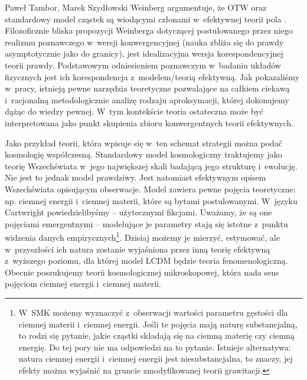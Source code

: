 \begin{artplenv}{Paweł Tambor, Marek Szydłowski}
Weinberg argumentuje, że OTW oraz standardowy model cząstek są wiodącymi członami w~efektywnej teorii pola
\parencite[][]{weinberg_effective_2016}. %
 Filozoficznie bliska propozycji Weinberga dotyczącej postulowanego przez niego realizmu poznawczego w~wersji konwergencyjnej (nauka zbliża się do prawdy asymptotycznie jako do granicy), jest idealizacyjna wersja korespondencyjnej teorii prawdy. Podstawowym odniesieniem poznawczym w~badaniu układów fizycznych jest ich korespondencja z~modelem/teorią efektywną. Jak pokazaliśmy w~pracy, istnieją pewne narzędzia teoretyczne pozwalające na całkiem ciekawą i~racjonalną metodologicznie analizę rodzaju aproksymacji, której dokonujemy dążąc do wiedzy pewnej. W~tym kontekście teoria ostateczna może być interpretowana jako punkt skupienia zbioru konwergentnych teorii efektywnych.

Jako przykład teorii, która wpisuje się w~ten schemat strategii można podać kosmologię współczesną. Standardowy model kosmologiczny traktujemy jako teorię Wszechświata w~jego największej skali badającą jego strukturę i~ewolucję. Nie jest to jednak model prawdziwy. Jest natomiast efektywnym opisem Wszechświata opisującym obserwacje. Model zawiera pewne pojęcia teoretyczne: np. ciemnej energii i~ciemnej materii, które są bytami postulowanymi. W~języku Cartwright powiedzielibyśmy -- użytecznymi fikcjami. Uważamy, że są one pojęciami emergentnymi -- modelujące je parametry stają się istotne z~punktu widzenia danych empirycznych\footnote{W~SMK możemy wyznaczyć z~obserwacji wartości parametru gęstości dla ciemnej materii i~ciemnej energii. Jeśli te pojęcia mają naturę substancjalną, to rodzi się pytanie, jakie cząstki składają się na ciemną materię czy ciemną energię. Do tej pory nie ma odpowiedzi na to pytanie. Istnieje alternatywa: natura ciemnej energii i~ciemnej energii jest niesubstancjalna, to znaczy, jej efekty można wyjaśnić na gruncie zmodyfikowanej teorii grawitacji.}. Dzisiaj możemy je mierzyć, estymować, ale w~przyszłości ich natura zostanie wyjaśniona przez inną teorię efektywną z~wyższego poziomu, dla której model LCDM będzie teoria fenomenologiczną. Obecnie poszukujemy teorii kosmologicznej mikroskopowej, która nada sens pojęciom ciemnej energii i~ciemnej materii.


\end{artplenv}
